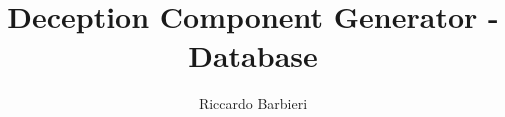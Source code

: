 \documentclass[12pt]{article}
\begin{document}
\title{Deception Component Generator - Database}
\author{Riccardo Barbieri}
\maketitle
\newpage

\tableofcontents
\newpage






\end{document}

